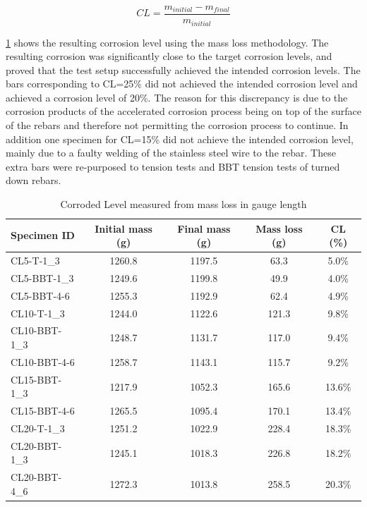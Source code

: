 \begin{equation}
    CL=\frac{m_{initial}-m_{final}}{m_{initial}}
    \label{eq:mass_loss_CL}
\end{equation}

\ref{tab:CL_mass_loss} shows the resulting corrosion level using the mass loss methodology. The resulting corrosion was significantly close to the target corrosion levels, and proved that the test setup successfully achieved the intended corrosion levels. The bars corresponding to CL=25\% did not achieved the intended corrosion level and achieved a corrosion level of 20\%. The reason for this discrepancy is due to the corrosion products of the accelerated corrosion process being on top of the surface of the rebars and therefore not permitting the corrosion process to continue. In addition one specimen for CL=15\% did not achieve the intended corrosion level, mainly due to a faulty welding of the stainless steel wire to the rebar. These extra bars were re-purposed to tension tests and BBT tension tests of turned down rebars.

\begin{table}[]
\caption{Corroded Level measured from mass loss in gauge length}
\label{tab:CL_mass_loss}
\begin{center}
\begin{tabular}{lcccc}
Specimen ID & Initial mass (g) & Final mass (g) & Mass loss (g) & CL (\%) \\ \hline
CL5-T-1\_3    & 1260.8           & 1197.5         & 63.3          & 5.0\%   \\
CL5-BBT-1\_3  & 1249.6           & 1199.8         & 49.9          & 4.0\%   \\
CL5-BBT-4-6   & 1255.3           & 1192.9         & 62.4          & 4.9\%   \\
CL10-T-1\_3   & 1244.0           & 1122.6         & 121.3         & 9.8\%   \\
CL10-BBT-1\_3 & 1248.7           & 1131.7         & 117.0         & 9.4\%   \\
CL10-BBT-4-6  & 1258.7           & 1143.1         & 115.7         & 9.2\%   \\
CL15-BBT-1\_3 & 1217.9           & 1052.3         & 165.6         & 13.6\%  \\
CL15-BBT-4-6  & 1265.5           & 1095.4         & 170.1         & 13.4\%  \\
CL20-T-1\_3   & 1251.2           & 1022.9         & 228.4         & 18.3\%  \\
CL20-BBT-1\_3 & 1245.1           & 1018.3         & 226.8         & 18.2\%  \\
CL20-BBT-4\_6  & 1272.3           & 1013.8         & 258.5         & 20.3\% 
\end{tabular}
\end{center}
\end{table}

